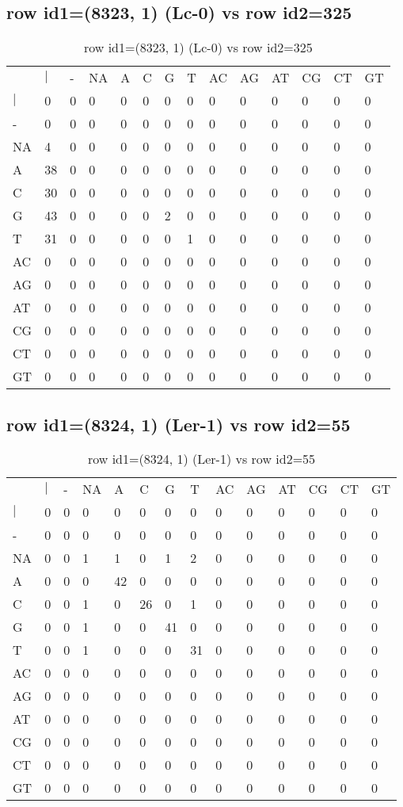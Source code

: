 \subsection{row id1=(8323, 1) (Lc-0) vs row id2=325}
\begin{center}
\begin{longtable}{|l|l|l|l|l|l|l|l|l|l|l|l|l|l|}
\caption{row id1=(8323, 1) (Lc-0) vs row id2=325} \label{table_dm514}\\
\hline
\\
\hline
&$|$&-&NA&A&C&G&T&AC&AG&AT&CG&CT&GT\\
$|$&0&0&0&0&0&0&0&0&0&0&0&0&0\\
-&0&0&0&0&0&0&0&0&0&0&0&0&0\\
NA&4&0&0&0&0&0&0&0&0&0&0&0&0\\
A&38&0&0&0&0&0&0&0&0&0&0&0&0\\
C&30&0&0&0&0&0&0&0&0&0&0&0&0\\
G&43&0&0&0&0&2&0&0&0&0&0&0&0\\
T&31&0&0&0&0&0&1&0&0&0&0&0&0\\
AC&0&0&0&0&0&0&0&0&0&0&0&0&0\\
AG&0&0&0&0&0&0&0&0&0&0&0&0&0\\
AT&0&0&0&0&0&0&0&0&0&0&0&0&0\\
CG&0&0&0&0&0&0&0&0&0&0&0&0&0\\
CT&0&0&0&0&0&0&0&0&0&0&0&0&0\\
GT&0&0&0&0&0&0&0&0&0&0&0&0&0\\
\hline
\end{longtable}
\end{center}

\subsection{row id1=(8324, 1) (Ler-1) vs row id2=55}
\begin{center}
\begin{longtable}{|l|l|l|l|l|l|l|l|l|l|l|l|l|l|}
\caption{row id1=(8324, 1) (Ler-1) vs row id2=55} \label{table_dm516}\\
\hline
\\
\hline
&$|$&-&NA&A&C&G&T&AC&AG&AT&CG&CT&GT\\
$|$&0&0&0&0&0&0&0&0&0&0&0&0&0\\
-&0&0&0&0&0&0&0&0&0&0&0&0&0\\
NA&0&0&1&1&0&1&2&0&0&0&0&0&0\\
A&0&0&0&42&0&0&0&0&0&0&0&0&0\\
C&0&0&1&0&26&0&1&0&0&0&0&0&0\\
G&0&0&1&0&0&41&0&0&0&0&0&0&0\\
T&0&0&1&0&0&0&31&0&0&0&0&0&0\\
AC&0&0&0&0&0&0&0&0&0&0&0&0&0\\
AG&0&0&0&0&0&0&0&0&0&0&0&0&0\\
AT&0&0&0&0&0&0&0&0&0&0&0&0&0\\
CG&0&0&0&0&0&0&0&0&0&0&0&0&0\\
CT&0&0&0&0&0&0&0&0&0&0&0&0&0\\
GT&0&0&0&0&0&0&0&0&0&0&0&0&0\\
\hline
\end{longtable}
\end{center}

